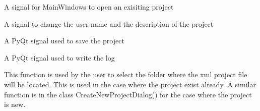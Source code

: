 \documentclass[letterpaper,10pt,english]{sphinxmanual}
\begin{document}
\begin{fulllineitems}
\begin{fulllineitems}
\label{\detokenize{index:src_GUI.Main_windows_1.WelcomeW.open_proj}}
A signal for MainWindows to open an exisiting project

\end{fulllineitems}


\begin{fulllineitems}
\label{\detokenize{index:src_GUI.Main_windows_1.WelcomeW.save_info_signal}}
A signal to change the user name and the description of the project

\end{fulllineitems}


\begin{fulllineitems}
\label{\detokenize{index:src_GUI.Main_windows_1.WelcomeW.save_signal}}
A PyQt signal used to save the project

\end{fulllineitems}


\begin{fulllineitems}
\label{\detokenize{index:src_GUI.Main_windows_1.WelcomeW.send_log}}
A PyQt signal used to write the log

\end{fulllineitems}


\begin{fulllineitems}
\label{\detokenize{index:src_GUI.Main_windows_1.WelcomeW.setfolder2}}
This function is used by the user to select the folder where the xml project file will be located.
This is used in the case where the project exist already. A similar function is in the class CreateNewProjectDialog()
for the case where the project is new.

\end{fulllineitems}


\end{fulllineitems}
\end{document}
